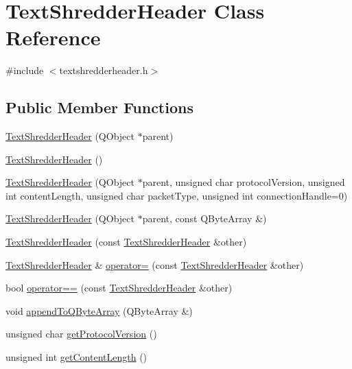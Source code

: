 \hypertarget{class_text_shredder_header}{
\section{TextShredderHeader Class Reference}
\label{class_text_shredder_header}
}


{\ttfamily \#include $<$textshredderheader.h$>$}

\subsection*{Public Member Functions}
\begin{DoxyCompactItemize}
\item 
\hyperlink{class_text_shredder_header_a710e334166b5c7b9b91897e46f63f3b5}{TextShredderHeader} (QObject $\ast$parent)
\item 
\hyperlink{class_text_shredder_header_a3a9da963dc639519819d6e87bf9c5c4d}{TextShredderHeader} ()
\item 
\hyperlink{class_text_shredder_header_ac48d4f60c290a67225d3848257048b19}{TextShredderHeader} (QObject $\ast$parent, unsigned char protocolVersion, unsigned int contentLength, unsigned char packetType, unsigned int connectionHandle=0)
\item 
\hyperlink{class_text_shredder_header_a4fa434dbeb695671d484f21e9d771fbe}{TextShredderHeader} (QObject $\ast$parent, const QByteArray \&)
\item 
\hyperlink{class_text_shredder_header_a618adc6a7918f55c8f6807b845e1547c}{TextShredderHeader} (const \hyperlink{class_text_shredder_header}{TextShredderHeader} \&other)
\item 
\hyperlink{class_text_shredder_header}{TextShredderHeader} \& \hyperlink{class_text_shredder_header_abcbd0ba41642a2340ef2556752048296}{operator=} (const \hyperlink{class_text_shredder_header}{TextShredderHeader} \&other)
\item 
bool \hyperlink{class_text_shredder_header_a83dfd4a857cce517216c7b6bca9652d6}{operator==} (const \hyperlink{class_text_shredder_header}{TextShredderHeader} \&other)
\item 
void \hyperlink{class_text_shredder_header_ad7e8deeb7d42051266808cd1552ec4dc}{appendToQByteArray} (QByteArray \&)
\item 
unsigned char \hyperlink{class_text_shredder_header_a96a0170a2228e193dadf92ca8265ea38}{getProtocolVersion} ()
\item 
unsigned int \hyperlink{class_text_shredder_header_a7aca6a07e8d76056d800d8cd04e45757}{getContentLength} ()

\end{DoxyCompactItemize}

